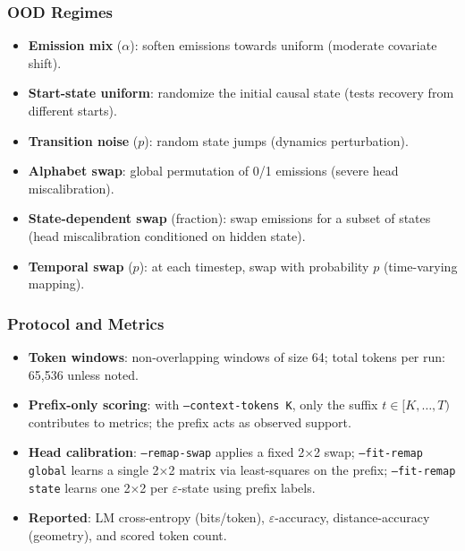 \documentclass[11pt]{article}
\begin{document}
\subsubsection{OOD Regimes}
\vspace{-0.5em}
\begin{itemize}
  \item \textbf{Emission mix} ($\alpha$): soften emissions towards uniform (moderate covariate shift).
  \item \textbf{Start-state uniform}: randomize the initial causal state (tests recovery from different starts).
  \item \textbf{Transition noise} ($p$): random state jumps (dynamics perturbation).
  \item \textbf{Alphabet swap}: global permutation of 0/1 emissions (severe head miscalibration).
  \item \textbf{State-dependent swap} (fraction): swap emissions for a subset of states (head miscalibration conditioned on hidden state).
  \item \textbf{Temporal swap} ($p$): at each timestep, swap with probability $p$ (time-varying mapping).
\end{itemize}

\subsubsection{Protocol and Metrics}
\vspace{-0.5em}
\begin{itemize}
  \item \textbf{Token windows}: non-overlapping windows of size 64; total tokens per run: 65,536 unless noted.
  \item \textbf{Prefix-only scoring}: with \texttt{--context-tokens K}, only the suffix $t\in[K,\dots,T)$ contributes to metrics; the prefix acts as observed support.
  \item \textbf{Head calibration}: \texttt{--remap-swap} applies a fixed 2×2 swap; \texttt{--fit-remap global} learns a single 2×2 matrix via least-squares on the prefix; \texttt{--fit-remap state} learns one 2×2 per $\varepsilon$-state using prefix labels.
  \item \textbf{Reported}: LM cross-entropy (bits/token), $\varepsilon$-accuracy, distance-accuracy (geometry), and scored token count.
\end{itemize}
\end{document}
